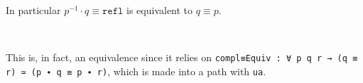 \begin{code}[hide]%
%
\>[2]\<%
\end{code}
In particular $p^{-1} \cdot q \equiv \texttt{refl}$ is equivalent to $q \equiv p$.
\begin{code}%
%
\>[2]\AgdaSpace{}%
\AgdaSymbol{:}%
\>[1193I]\AgdaSymbol{\{}\AgdaSpace{}%
\AgdaSymbol{:}\AgdaSpace{}%
\AgdaSymbol{\}}\AgdaSpace{}%
\AgdaSymbol{\{}\AgdaSpace{}%
\AgdaSpace{}%
\AgdaSymbol{:}\AgdaSpace{}%
\AgdaSymbol{\}}\AgdaSpace{}%
\<%
\\
\>[.][@{}l@{}]\<[1193I]%
\>[15]\AgdaSymbol{(}\AgdaSpace{}%
\AgdaSpace{}%
\AgdaSymbol{:}\AgdaSpace{}%
\AgdaSpace{}%
\AgdaSpace{}%
\AgdaSymbol{)}\AgdaSpace{}%
\AgdaSpace{}%
\AgdaSymbol{(}\AgdaSpace{}%
\AgdaSpace{}%
\AgdaSpace{}%
\AgdaSpace{}%
\AgdaSpace{}%
\AgdaSymbol{)}\AgdaSpace{}%
\AgdaSpace{}%
\AgdaSymbol{(}\AgdaSpace{}%
\AgdaSpace{}%
\AgdaSymbol{)}\<%
\end{code}
This is, in fact, an equivalence since it relies on
\texttt{compl≡Equiv : ∀ p q r → (q ≡ r) ≃ (p ∙ q ≡ p ∙ r)}, which is made into a
path with \texttt{ua}.
